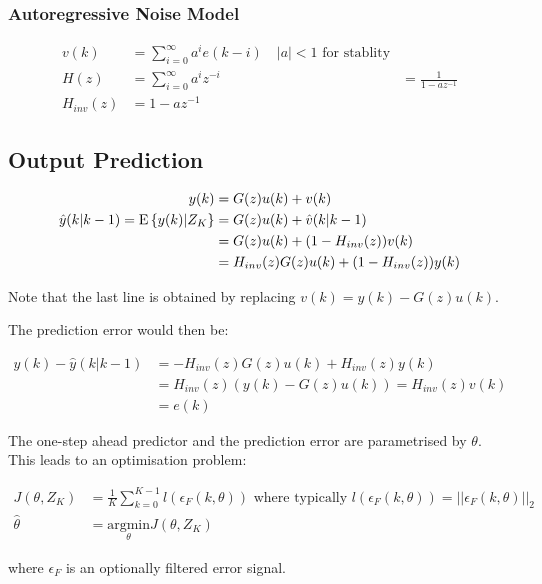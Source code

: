 \documentclass[10pt,a4paper]{scrartcl}
\begin{document}
\begin{multicols*}{2}
\subsubsection{Autoregressive Noise Model}

\begin{align*}
v(k)&=\sum\limits_{i=0}^\infty a^i e(k-i)\quad |a|<1 \text{ for stablity}\\
H(z)&=\sum\limits_{i=0}^\infty a^iz^{-i}&=\frac{1}{1-az^{-1}}\\
H_{inv}(z)&=1-az^{-1}
\end{align*}


\subsection{Output Prediction}

\begin{align*}
y(k)&=G(z)u(k)+v(k)\\
\hat{y}(k|k-1)=\text{E}\left\{y(k)|Z_K\right\}&=G(z)u(k)+\hat{v}(k|k-1)\\
&=G(z)u(k)+(1-H_{inv}(z))v(k)\\
&=H_{inv}(z)G(z)u(k)+(1-H_{inv}(z))y(k)
\end{align*}

Note that the last line is obtained by replacing $v(k) = y(k) - G(z)u(k)$.

\vspace{3ex}

The prediction error would then be:

\begin{align*}
y(k)-\hat{y}(k|k-1)&=-H_{inv}(z)G(z)u(k)+H_{inv}(z)y(k)\\
&=H_{inv}(z)(y(k)-G(z)u(k))=H_{inv}(z)v(k)\\
&=e(k)
\end{align*}

The one-step ahead predictor and the prediction error are parametrised by $\theta$. This leads to an optimisation problem:

\begin{align*}
J(\theta,Z_K)&=\frac{1}{K}\sum\limits_{k=0}^{K-1}l(\epsilon_F(k,\theta))\text{ where typically } l(\epsilon_F(k,\theta))=||\epsilon_F(k,\theta)||_2\\
\hat{\theta}&=\underset{\theta}{\text{argmin}}J(\theta,Z_K)
\end{align*}

where $\epsilon_F$ is an optionally filtered error signal.


\end{multicols*}
\end{document}

